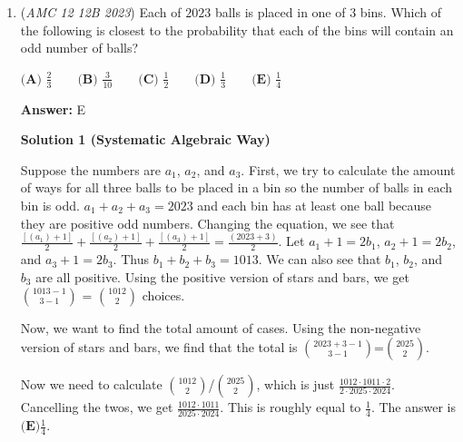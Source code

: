\begin{enumerate}
 The relationship leads to
 \[\frac{a_1+\dots+a_n+a_1'+\dots+a_n'-18n'}{n+n'}=\frac{b_1+\dots+b_m+b_1'+\dots+b_m'+3m-15m'}{m+m'}, \text{or}\]
 \[\frac{a_1+\dots+a_n+a_1'+\dots+a_n'}{n+n'}-\frac{18n'}{n'+n}-\frac{3m}{m+m'}+\frac{15m'}{m+m'}=\frac{b_1+\dots+b_m+b_1'+\dots+b_m'}{m+m'}.\]For choice $(A)$ to be true, $-\frac{18n'}{n'+n}-\frac{3m}{m+m'}+\frac{15m'}{m+m'}$ must be $-22$.

 
Let $n'=kn$ and $m'=k'm$.
 \[-\frac{18n'}{n'+n}-\frac{3m}{m+m'}+\frac{15m'}{m+m'}=-\frac{18kn}{n(k+1)}-\frac{3m}{m(k'+1)}+\frac{15k'm}{m(k'+1)}=-\frac{18kn}{n(k+1)}+\frac{3m(5k'-1)}{m(k'+1)}\]$n,n',m,m',k\text{ and }k'$ must be non-zero integer to satisfy the condition in the question. While the equation above is a multiple of three, 22 is not. Therefore, choice $\boxed{(A) \text{ cannot be true.}}$



	\item (\textit{AMC 12 12B 2023}) Each of $2023$ balls is placed in one of $3$ bins. Which of the following is closest to the probability that each of the bins will contain an odd number of balls?


 $\textbf{(A) } \frac{2}{3} \qquad \textbf{(B) } \frac{3}{10} \qquad \textbf{(C) } \frac{1}{2} \qquad \textbf{(D) } \frac{1}{3} \qquad \textbf{(E) } \frac{1}{4}$

 \textbf{Answer: }E



\textbf{Solution 1 (Systematic Algebraic Way)}

Suppose the numbers are $a_1$, $a_2$, and $a_3$. First, we try to calculate the amount of ways for all three balls to be placed in a bin so the number of balls in each bin is odd. $a_1+a_2+a_3=2023$ and each bin has at least one ball because they are positive odd numbers. Changing the equation, we see that $\frac{[(a_1)+1]}{2}+\frac{[(a_2)+1]}{2}+\frac{[(a_3)+1]}{2}=\frac{(2023+3)}{2}$. Let $a_1+1=2b_1$, $a_2+1=2b_2$, and $a_3+1=2b_3$. Thus $b_1+b_2+b_3=1013$. We can also see that $b_1$, $b_2$, and $b_3$ are all positive. Using the positive version of stars and bars, we get ${1013-1 \choose 3-1}$ = ${1012 \choose 2}$ choices. 

 Now, we want to find the total amount of cases. Using the non-negative version of stars and bars, we find that the total is ${2023+3-1 \choose 3-1}$=${2025 \choose 2}$. 

 Now we need to calculate ${1012 \choose 2}$/${2025 \choose 2}$, which is just $\frac{1012 \cdot 1011 \cdot 2}{2 \cdot 2025 \cdot 2024}$. Cancelling the twos, we get $\frac{1012 \cdot 1011}{2025 \cdot 2024}$. This is roughly equal to $\frac{1}{4}$. The answer is $\boxed{\textbf{(E)} \frac{1}{4}}$.


\end{enumerate}
